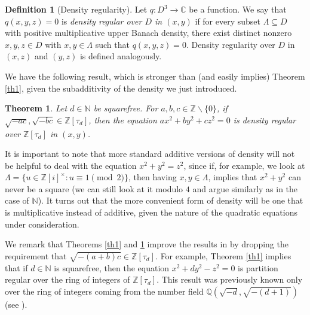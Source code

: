 \documentclass[11pt]{amsart}
\newtheorem{theorem}[lemma]{Theorem}
\theoremstyle{definition}
\newtheorem{definition}[lemma]{Definition}
\newcommand{\C}{{\mathbb C}}
\newcommand{\N}{{\mathbb N}}
\newcommand{\Q}{{\mathbb Q}}
\newcommand{\Z}{{\mathbb Z}}
\begin{document}
\begin{definition}[Density regularity]\label{def: density reg}
    Let $q\colon D^{3}\to \C$ be a function. We say that $q(x,y,z)=0$ is \emph{density regular over $D$ in $(x,y)$} if for every subset $\Lambda \subseteq D$ with positive multiplicative upper Banach density, there exist distinct nonzero $x,y,z\in D$ with $x,y\in \Lambda$ such that $q(x,y,z)=0$. Density regularity over $D$ in $(x,z)$ and $(y,z)$ is defined analogously.
\end{definition}

 


We have the following result, which is stronger than (and easily implies) Theorem \ref{th1}, given the subadditivity of the density we just introduced.

\begin{theorem}\label{th1density}
    Let  $d\in\N$ be squarefree. For $a,b,c\in\Z\backslash\{0\}$, if $\sqrt{-ac}, \sqrt{-bc}\in \Z[\tau_{d}]$, then the equation $ax^{2}+by^{2}+cz^{2}=0$ is density regular over $\Z[\tau_{d}]$ in $(x,y)$.
\end{theorem}

It is important to note that more standard additive versions of density will not be helpful to deal with the equation $x^2+y^2=z^2$, since if, for example, we look at $\Lambda=\{ u \in \Z[i]^{\times} : u \equiv 1 \pmod{2}\}$, then having $x, y \in \Lambda$, implies that $x^2+y^2$ can never be a square (we can still look at it modulo $4$ and argue similarly as in the case of $\N$).
It turns out that the more convenient form of density will be one that is multiplicative instead of additive, given the nature of the quadratic equations under consideration. 





We remark that Theorems \ref{th1} and \ref{th1density} improve the results in \cite{S18,S23} by dropping the requirement that $\sqrt{-(a+b)c}\in \Z[\tau_{d}]$. 
For example, Theorem \ref{th1} implies that if $d\in\N$ is squarefree, then the equation $x^{2}+dy^{2}-z^{2}=0$ is partition regular over the ring of integers of $\Z[\tau_d]$. This result was previously known only over the ring of integers coming from the number field $\Q(\sqrt{-d},\sqrt{-(d+1)})$ (see \cite{S23}).
\end{document}
